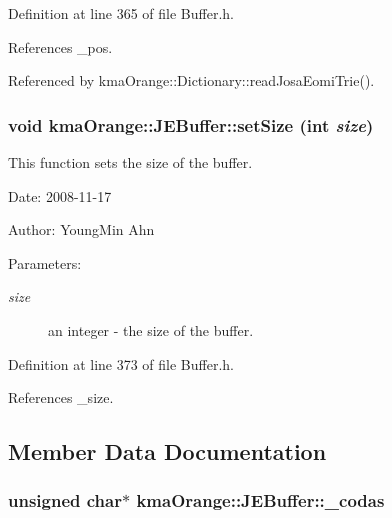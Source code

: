 Definition at line 365 of file Buffer.h.

References \_\-pos.

Referenced by kmaOrange::Dictionary::readJosaEomiTrie().\hypertarget{classkmaOrange_1_1JEBuffer_d602533167f2eb6719e70d62c1f9345d}{
\subsubsection[{setSize}]{\setlength{\rightskip}{0pt plus 5cm}void kmaOrange::JEBuffer::setSize (int {\em size})}}
\label{classkmaOrange_1_1JEBuffer_d602533167f2eb6719e70d62c1f9345d}


This function sets the size of the buffer. 

\begin{Desc}
\item[Date:]2008-11-17 \end{Desc}
\begin{Desc}
\item[Author:]YoungMin Ahn \end{Desc}
\begin{Desc}
\item[Parameters:]
\begin{description}
\item[{\em size}]an integer - the size of the buffer. \end{description}
\end{Desc}


Definition at line 373 of file Buffer.h.

References \_\-size.

\subsection{Member Data Documentation}
\hypertarget{classkmaOrange_1_1JEBuffer_29fea2590f8a6de7f9e68c1ef8209be8}{
\subsubsection[{\_\-codas}]{\setlength{\rightskip}{0pt plus 5cm}unsigned char$\ast$ {\bf kmaOrange::JEBuffer::\_\-codas}}}
\label{classkmaOrange_1_1JEBuffer_29fea2590f8a6de7f9e68c1ef8209be8}


